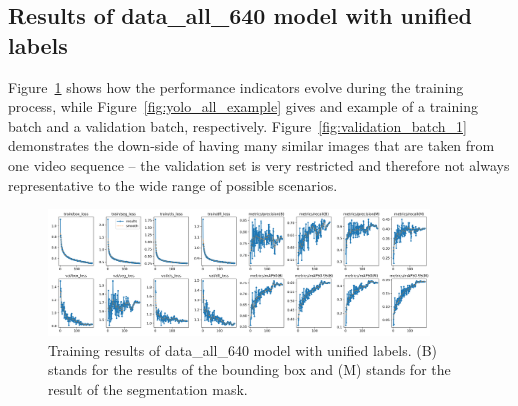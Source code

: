 \documentclass[Master,MDS,english]{BASE/twbook} %
\begin{document}
\subsection{Results of data\_all\_640 model with unified labels}

Figure~\ref{fig:training_all} shows how the performance indicators evolve during the training process, while Figure~\ref{fig:yolo_all_example} gives and example of a training batch and a validation batch, respectively.
Figure~\ref{fig:validation_batch_1} demonstrates the down-side of having many similar images that are taken from one video sequence -- the validation set is very restricted and therefore not always representative to the wide range of possible scenarios.


\begin{figure}[h]
\centering
\includegraphics[width=0.9\textwidth]{images/yolo/all/results}
\caption{Training results of data\_all\_640 model with unified labels. (B) stands for the results of the bounding box and (M) stands for the result of the segmentation mask.}
\label{fig:training_all}
\end{figure}
\end{document}
